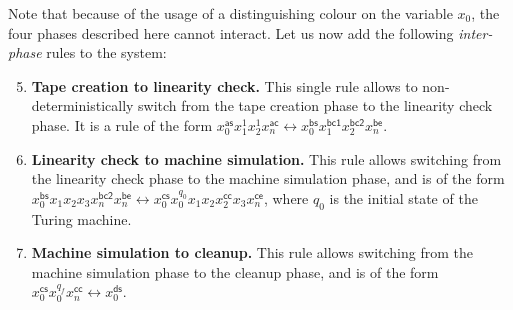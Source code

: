 Note that because of the usage of a distinguishing colour on the variable $x_0$,
the four phases described here cannot interact. Let us now add 
the following \emph{inter-phase} rules to the system:
\begin{enumerate}
  \setcounter{enumi}{4}
  \item \label{item:undecidability-5}
    \textbf{Tape creation to linearity check.}
    This single rule allows to non-deterministically
    switch from the tape creation phase to the linearity check phase.
    It is a rule of the form
    $x_0^{\mathsf{as}} x_1^{1} x_2^{1} x_n^{\mathsf{ac}} 
    \leftrightarrow
    x_0^{\mathsf{bs}} x_1^{\mathsf{bc1}} x_2^{\mathsf{bc2}} x_n^{\mathsf{be}}$.
  \item \label{item:undecidability-6}
    \textbf{Linearity check to machine simulation.}
    This rule allows switching from the linearity check phase to the machine
    simulation phase, and is of the form
    $x_0^{\mathsf{bs}} x_1 x_2 x_3 x_n^{\mathsf{bc2}} x_n^{\mathsf{be}} \leftrightarrow 
    x_0^{\mathsf{cs}} x_0^{q_0} x_1 x_2 x_2^{\mathsf{cc}} x_3 x_n^{\mathsf{ce}}$,
    where $q_0$ is the initial state of the Turing machine.
  \item \label{item:undecidability-7}
    \textbf{Machine simulation to cleanup.}
    This rule allows switching from the machine simulation phase to the cleanup
    phase, and is of the form
    $x_0^{\mathsf{cs}} x_0^{q_f}  x_n^{\mathsf{cc}} \leftrightarrow 
    x_0^{\mathsf{ds}}$.
\end{enumerate}

